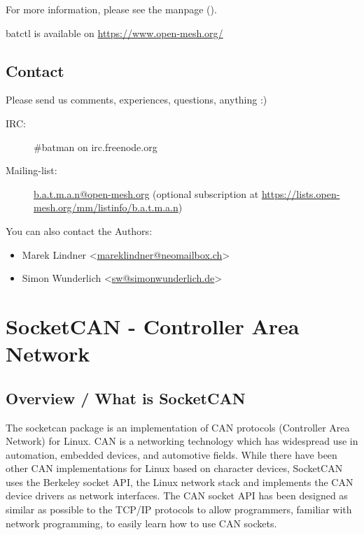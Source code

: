 \documentclass[a4paper,8pt,english]{sphinxmanual}
\begin{document}
For more information, please see the manpage ().

batctl is available on \href{https://www.open-mesh.org/}{https://www.open-mesh.org/}


\section{Contact}
\label{networking/batman-adv:contact}
Please send us comments, experiences, questions, anything :)
\begin{description}
\item[{IRC:}] \leavevmode
\#batman on irc.freenode.org

\item[{Mailing-list:}] \leavevmode
\href{mailto:b.a.t.m.a.n@open-mesh.org}{b.a.t.m.a.n@open-mesh.org} (optional subscription at
\href{https://lists.open-mesh.org/mm/listinfo/b.a.t.m.a.n}{https://lists.open-mesh.org/mm/listinfo/b.a.t.m.a.n})

\end{description}

You can also contact the Authors:
\begin{itemize}
\item {} 
Marek Lindner \textless{}\href{mailto:mareklindner@neomailbox.ch}{mareklindner@neomailbox.ch}\textgreater{}

\item {} 
Simon Wunderlich \textless{}\href{mailto:sw@simonwunderlich.de}{sw@simonwunderlich.de}\textgreater{}

\end{itemize}


\chapter{SocketCAN - Controller Area Network}
\label{networking/can:socketcan-controller-area-network}\label{networking/can::doc}

\section{Overview / What is SocketCAN}
\label{networking/can:overview-what-is-socketcan}
The socketcan package is an implementation of CAN protocols
(Controller Area Network) for Linux.  CAN is a networking technology
which has widespread use in automation, embedded devices, and
automotive fields.  While there have been other CAN implementations
for Linux based on character devices, SocketCAN uses the Berkeley
socket API, the Linux network stack and implements the CAN device
drivers as network interfaces.  The CAN socket API has been designed
as similar as possible to the TCP/IP protocols to allow programmers,
familiar with network programming, to easily learn how to use CAN
sockets.
\end{document}
